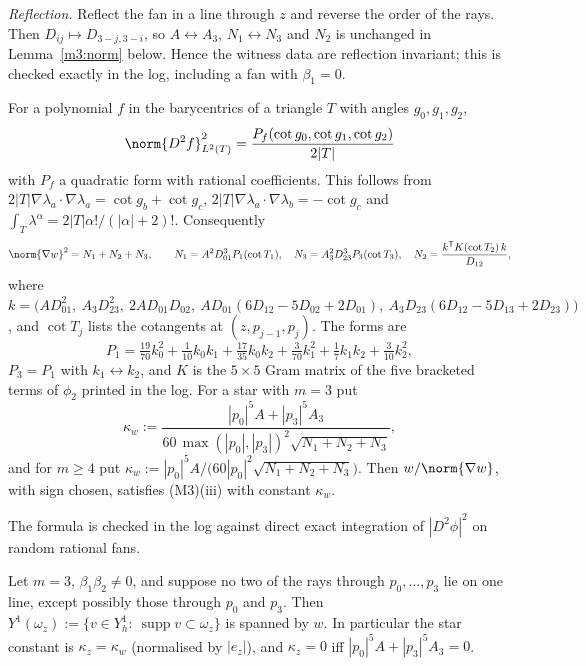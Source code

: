 \emph{Reflection.} Reflect the fan in a line through $z$ and reverse the order of the rays. Then $D_{ij}\mapsto D_{3-j,3-i}$, so $A\leftrightarrow A_3$, $N_1\leftrightarrow N_3$ and $N_2$ is unchanged in Lemma~\ref{m3:norm} below. Hence the witness data are reflection invariant; this is checked exactly in the log, including a fan with $\beta_1=0$.

\begin{lemma}\label{m3:norm}
For a polynomial $f$ in the barycentrics of a triangle $T$ with angles $g_0,g_1,g_2$,
\[
\norm{D^2f}_{L^2(T)}^2=\frac{P_f(\cot g_0,\cot g_1,\cot g_2)}{2|T|}
\]
with $P_f$ a quadratic form with rational coefficients. This follows from $2|T|\nabla\lambda_a\cdot\nabla\lambda_a=\cot g_b+\cot g_c$, $2|T|\nabla\lambda_a\cdot\nabla\lambda_b=-\cot g_c$ and $\int_T\lambda^\alpha=2|T|\alpha!/(|\alpha|+2)!$. Consequently
\[
\norm{\nabla w}^2=N_1+N_2+N_3,\qquad N_1=A^2D_{01}^3P_1(\cot T_1),\quad N_3=A_3^2D_{23}^3P_3(\cot T_3),\quad N_2=\frac{k^{\mathsf T}K(\cot T_2)\,k}{D_{12}},
\]
where $k=\bigl(AD_{01}^2,\ A_3D_{23}^2,\ 2AD_{01}D_{02},\ AD_{01}(6D_{12}-5D_{02}+2D_{01}),\ A_3D_{23}(6D_{12}-5D_{13}+2D_{23})\bigr)$, and $\cot T_j$ lists the cotangents at $(z,p_{j-1},p_j)$. The forms are
\[
P_1=\tfrac{19}{70}k_0^2+\tfrac1{10}k_0k_1+\tfrac{17}{35}k_0k_2+\tfrac3{70}k_1^2+\tfrac17k_1k_2+\tfrac3{10}k_2^2,
\]
$P_3=P_1$ with $k_1\leftrightarrow k_2$, and $K$ is the $5\times5$ Gram matrix of the five bracketed terms of $\phi_2$ printed in the log. For a star with $m=3$ put
\[
\kappa_w:=\frac{|p_0|^5A+|p_3|^5A_3}{60\,\max(|p_0|,|p_3|)^2\sqrt{N_1+N_2+N_3}},
\]
and for $m\ge4$ put $\kappa_w:=|p_0|^5A/\bigl(60|p_0|^2\sqrt{N_1+N_2+N_3}\bigr)$. Then $w/\norm{\nabla w}$, with sign chosen, satisfies (M3)(iii) with constant $\kappa_w$.
\end{lemma}

The formula is checked in the log against direct exact integration of $|D^2\phi|^2$ on random rational fans.

\begin{lemma}[Uniqueness for $m=3$]\label{m3:dim}
Let $m=3$, $\beta_1\beta_2\ne0$, and suppose no two of the rays through $p_0,\dots,p_3$ lie on one line, except possibly those through $p_0$ and $p_3$. Then $Y^1(\omega_z):=\{v\in Y_h^1:\ \operatorname{supp}v\subset\omega_z\}$ is spanned by $w$. In particular the star constant is $\kappa_z=\kappa_w$ (normalised by $|e_z|$), and $\kappa_z=0$ iff $|p_0|^5A+|p_3|^5A_3=0$.
\end{lemma}

